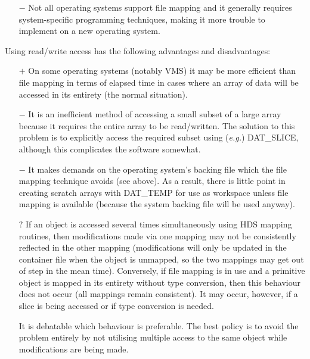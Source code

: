 \begin{description}
\begin{itemize}
\item[$-$] Not all operating systems support file mapping and it generally
requires system-specific programming techniques, making it more trouble to
implement on a new operating system.

\end{itemize}

Using read/write access has the following advantages and disadvantages:

\begin{itemize}

\item[$+$] On some operating systems (notably VMS) it may be more efficient than
file mapping in terms of elapsed time in cases where an array of data will be
accessed in its entirety (the normal situation).

\item[$-$] It is an inefficient method of accessing a small subset of a large
array because it requires the entire array to be read/written. The solution to
this problem is to explicitly access the required subset using ({\em e.g.\/})
DAT\_SLICE, although this complicates the software somewhat.

\item[$-$] It makes demands on the operating system's backing file which the
file mapping technique avoids (see above). As a result, there is little point
in creating scratch arrays with DAT\_TEMP for use as workspace unless
file mapping is available (because the system backing file will be used anyway).

\item[$?$] If an object is accessed several times simultaneously using HDS
mapping routines, then modifications made via one mapping may not be
consistently reflected in the other mapping (modifications will only be updated
in the container file when the object is unmapped, so the two mappings may get
out of step in the mean time). Conversely, if file mapping is in use and a
primitive object is mapped in its entirety without type conversion, then this
behaviour does not occur (all mappings remain consistent). It may occur,
however, if a slice is being accessed or if type conversion is needed.

It is debatable which behaviour is preferable. The best policy is to avoid the
problem entirely by not utilising multiple access to the same object while
modifications are being made.

\end{itemize}


\end{description}
